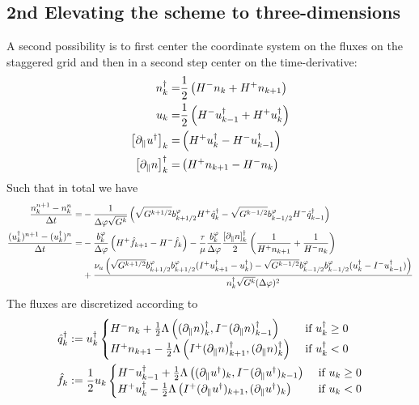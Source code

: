 \subsection{2nd Elevating the scheme to three-dimensions}
A second possibility is to first center the coordinate system on the fluxes on the staggered grid and then
in a second step center on the time-derivative:
\begin{align}
n_k^\dagger =& \frac{1}{2}\left( H^- n_k + H^+ n_{k+1}\right) \\
u_k =& \frac{1}{2}\left( H^- u^\dagger_{k-1} + H^+ u_{k}^\dagger\right)\\
\left[\partial_\parallel u^\dagger \right]_k =& \left( H^+ u^\dagger_{k} - H^-
u^\dagger_{k-1}\right) \\
\left[\partial_\parallel n\right]^\dagger_k =& \left( H^+ n_{k+1} - H^-
n_k\right)
\end{align}
Such that in total we have
\begin{align}
    \frac{n_k^{n+1} - n_k^n}{\Delta t} = &-\frac{1}{\Delta\varphi \sqrt{G^k}}
    \left( \sqrt{G^{k+1/2}}b^\varphi_{k+1/2}  H^+ \hat q_{k}^\dagger
    -\sqrt{G^{k-1/2}}b^\varphi_{k-1/2}  H^- \hat q_{k-1}^\dagger \right)
     \\
    \frac{(u_k^\dagger)^{n+1}-(u_k^\dagger)^{n}}{\Delta t} = &-
 \frac{b^\varphi_k}{\Delta\varphi}\left( H^+\hat f_{k+1} - H^-\hat f_k\right)
 -\frac{\tau}{\mu}\frac{b^\varphi_k}{\Delta\varphi} \frac{[\partial_\parallel
 n]^\dagger_k}{2}\left( \frac{1}{H^+ n_{k+1}} + \frac{1}{H^- n_k} \right)
    \nonumber\\
    &+ \frac{\nu_u
        \left(\sqrt{G^{k+1/2}}b^\varphi_{k+1/2}b^\varphi_{k+1/2} (I^+ u^\dagger_{k+1} - u^\dagger_k)
        - \sqrt{G^{k-1/2}}b^\varphi_{k-1/2}b^\varphi_{k-1/2} ( u^\dagger_k - I^- u^\dagger_{k-1})\right)
    }{n^\dagger_{k} \sqrt{G^k}(\Delta \varphi)^2}
\end{align}
The fluxes are discretized according to
\begin{align}
    \hat q^\dagger_k &:= u^\dagger_k \begin{cases}
        H^- n_k     + \frac{1}{2}\Lambda\left( (\partial_\parallel n)^\dagger_k, I^- (\partial_\parallel n)^\dagger_{k-1}\right)&\text{ if } u^\dagger_k \geq 0 \\
        H^+ n_{k+1} - \frac{1}{2}\Lambda\left( I^+(\partial_\parallel n)^\dagger_{k+1}, (\partial_\parallel n)^\dagger_k\right) &\text{ if } u^\dagger_k < 0
    \end{cases}
    \\
    \hat f_k &:= \frac{1}{2}u_k\begin{cases}
        H^- u^\dagger_{k-1} + \frac{1}{2}\Lambda\left( (\partial_\parallel u^\dagger )_k, I^- (\partial_\parallel u^\dagger)_{k-1}\right)&\text{ if } u_k \geq 0 \\
        H^+ u^\dagger_{k}   - \frac{1}{2}\Lambda\left( I^+(\partial_\parallel u^\dagger)_{k+1}, (\partial_\parallel u^\dagger)_k\right) &\text{ if } u_k < 0 \\
    \end{cases}
\end{align}


